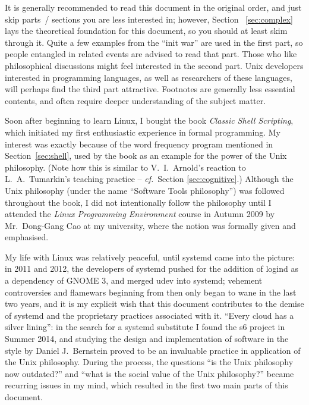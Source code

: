 \documentclass{article}
\newcommand*{\cf}{\emph{cf.}}
\begin{document}
It is generally recommended to read this document in the original order, and
just skip parts~/ sections you are less interested in; however, Section~%
\ref{sec:complex} lays the theoretical foundation for this document, so you
should at least skim through it.  Quite a few examples from the ``init war''
are used in the first part, so people entangled in related events are advised
to read that part.  Those who like philosophical discussions might feel
interested in the second part.  Unix developers interested in programming
languages, as well as researchers of these languages, will perhaps find
the third part attractive.  Footnotes are generally less essential
contents, and often require deeper understanding of the subject matter.





\newpart
\printbibliography[heading = bibintoc, title = References]
\newpage
{}\label{sec:afterword}

Soon after beginning to learn Linux, I bought the book \emph{Classic Shell
Scripting}, which initiated my first enthusiastic experience in formal
programming.  My interest was exactly because of the word frequency program
mentioned in Section~\ref{sec:shell}, used by the book as an example for the
power of the Unix philosophy.  (Note how this is similar to V.~I.\ Arnold's
reaction to L.~A.\ Tumarkin's teaching practice -- \cf~Section
\ref{sec:cognitive}.)  Although the Unix philosophy (under the name
``Software Tools philosophy'') was followed throughout the book, I did
not intentionally follow the philosophy until I attended the \emph{Linux
Programming Environment} course in Autumn 2009 by Mr.\ Dong-Gang Cao
at my university, where the notion was formally given and emphasised.

My life with Linux was relatively peaceful, until systemd came into the picture:
in 2011 and 2012, the developers of systemd pushed for the addition of logind
as a dependency of GNOME 3, and merged udev into
systemd; vehement controversies and flamewars beginning
from then only began to wane in the last two years,
and it is my explicit wish that this document contributes to the demise of
systemd and the proprietary practices associated with it.  ``Every cloud has
a silver lining'': in the search for a systemd substitute I found the s6 project
in Summer 2014, and studying the design and implementation of software in the
style by Daniel J.\ Bernstein proved to be an invaluable practice in application
of the Unix philosophy.  During the process, the questions ``is the Unix
philosophy now outdated?'' and ``what is the social value of the Unix
philosophy?'' became recurring issues in my mind, which resulted
in the first two main parts of this document.
\end{document}
